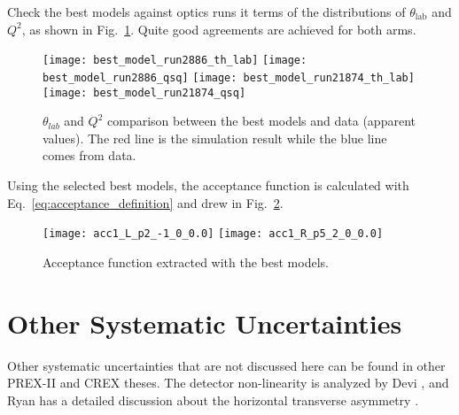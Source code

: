 Check the best models against optics runs it terms of the distributions of
$\theta_{\text{lab}}$ and $Q^2$, as shown in Fig.~\ref{fig:best_model_check}.
Quite good agreements are achieved for both arms.
\begin{figure}[H]
    \centering
    \texttt{[image: best\_model\_run2886\_th\_lab]}
    \texttt{[image: best\_model\_run2886\_qsq]}
    \texttt{[image: best\_model\_run21874\_th\_lab]}
    \texttt{[image: best\_model\_run21874\_qsq]}
    \caption{$\theta_{lab}$ and $Q^2$ comparison between the best models and data (apparent values).
    The red line is the simulation result while the blue line comes from data.}
    \label{fig:best_model_check}
\end{figure}

Using the selected best models, the acceptance function is
calculated with Eq.~\ref{eq:acceptance_definition} and drew in Fig.~\ref{fig:acceptance_function}.
\begin{figure}[H]
    \centering
    \texttt{[image: acc1\_L\_p2\_-1\_0\_0.0]}
    \texttt{[image: acc1\_R\_p5\_2\_0\_0.0]}
    \caption{Acceptance function extracted with the best models.}
    \label{fig:acceptance_function}
\end{figure}

\section{Other Systematic Uncertainties}
Other systematic uncertainties that are not discussed here can be found in other 
PREX-II and CREX theses. The detector non-linearity is analyzed by Devi \cite{Devi2021},
and Ryan has a detailed discussion about the horizontal transverse asymmetry \cite{Ryan2021}.

